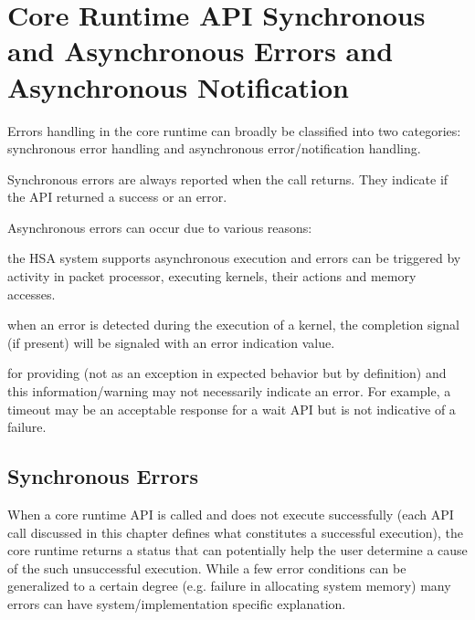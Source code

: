 \begin{DIFnomarkup}
\hypertarget{error}{}\section{Core Runtime API Synchronous and Asynchronous Errors and
Asynchronous Notification}
\label{error}
\end{DIFnomarkup}

Errors handling in the core runtime can broadly be classified into
two categories: synchronous error handling and asynchronous
error/notification handling. 

Synchronous errors are always reported when the call returns. They
indicate if the API returned a success or an error.

Asynchronous errors can occur due to various reasons:
\begin{inparaenum}[(i)] \item the HSA system supports asynchronous
execution and errors can be triggered by activity in packet
processor, executing kernels, their actions and memory accesses.
\item when an error is detected during the execution of a kernel,
the completion signal (if present) will be signaled with an error
indication value.  \item for providing 
(not as an exception in expected behavior but by definition) and
this information/warning may not necessarily indicate an error. For
example, a timeout may be an acceptable response for a wait API but
is not indicative of a failure. \end{inparaenum}

\begin{DIFnomarkup}
\hypertarget{syncerror}{}\subsection{Synchronous Errors }\label{syncerror}
\end{DIFnomarkup}

When a core runtime API is called and does not execute successfully
(each API call discussed in this chapter defines what constitutes a
successful execution), the core runtime returns a status that can
potentially help the user determine a cause of the such unsuccessful
execution.  While a few error conditions can be generalized to a
certain degree (e.g. failure in allocating system memory) many
errors can have system/implementation specific explanation. 

